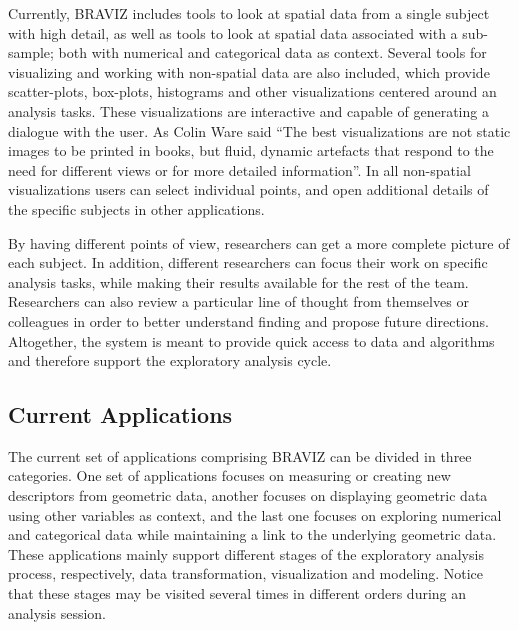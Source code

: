 \documentclass[utf8,paper]{frontiersSCNS} %
\begin{document}
Currently, BRAVIZ includes tools to look at spatial data from a single subject with high detail, as well as tools to look at spatial data associated with a sub-sample; both with numerical and categorical data as context. Several tools for visualizing and working with non-spatial data are also included, which provide scatter-plots, box-plots, histograms and other visualizations centered around an analysis tasks. These visualizations are interactive and capable of generating a dialogue with the user.
As Colin Ware \citep{ware_information_2004} said ``The best visualizations are not static images to be printed in books, but fluid, dynamic artefacts that respond to the need for different views or for more detailed information''. In all non-spatial visualizations users can select individual points, and open additional details of the specific subjects in other applications. 

By having different points of view, researchers can get a more complete picture of each subject. In addition, different researchers can focus their work on specific analysis tasks, while making their results available for the rest of the team. Researchers can also review a particular line of thought from themselves or colleagues in order to better understand finding and propose future directions. Altogether, the system is meant to provide quick access to data and algorithms and therefore support the exploratory analysis cycle. 

\subsection{Current Applications}


The current set of applications comprising BRAVIZ can be divided in three categories. One set of applications focuses on measuring or creating new descriptors from geometric data, another focuses on displaying geometric data using other variables as context, and the last one focuses on exploring numerical and categorical data while maintaining a link to the underlying geometric data. These applications mainly support different stages of the exploratory analysis process, respectively, data transformation, visualization and modeling. Notice that these stages may be visited several times in different orders during an analysis session.
\end{document}
